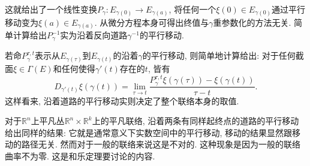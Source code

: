 这就给出了一个线性变换$P_{\gamma}:E_{\gamma(0)}\to E_{\gamma(a)}$, 将任何一个$\xi(0)\in E_{\gamma(0)}$通过平行移动变为$\xi(a)\in E_{\gamma(a)}$. 从微分方程本身可得出终值与$\gamma$重参数化的方法无关. 简单计算给出$P_\gamma^{-1}$实为沿着反向道路$\gamma^{-1}$的平行移动. 

若命$P_\gamma^{\tau,t}$表示从$E_{\gamma(\tau)}$到$E_{\gamma(t)}$的沿着$\gamma$的平行移动, 则简单地计算给出: 对于任何截面$\xi\in\Gamma(E)$和任何使得$\gamma'(t)$存在的$t$, 皆有
$$
D_{\gamma'(t)}\xi(\gamma(t))=\lim_{\tau\to t}\frac{P_\gamma^{\tau,t}\xi(\gamma(\tau))-\xi(\gamma(t))}{\tau-t}.
$$
这样看来, 沿着道路的平行移动实则决定了整个联络本身的取值.

对于$\mathbb{R}^n$上平凡丛$\mathbb{R}^n\times\mathbb{R}^k$上的平凡联络, 沿着两条有同样起终点的道路的平行移动给出同样的结果: 它就是通常意义下实数空间中的平行移动, 移动的结果显然跟移动的路径无关. 然而对于一般的联络来说这是不对的. 这种现象是因为一般的联络曲率不为零. 这是和乐定理要讨论的内容.